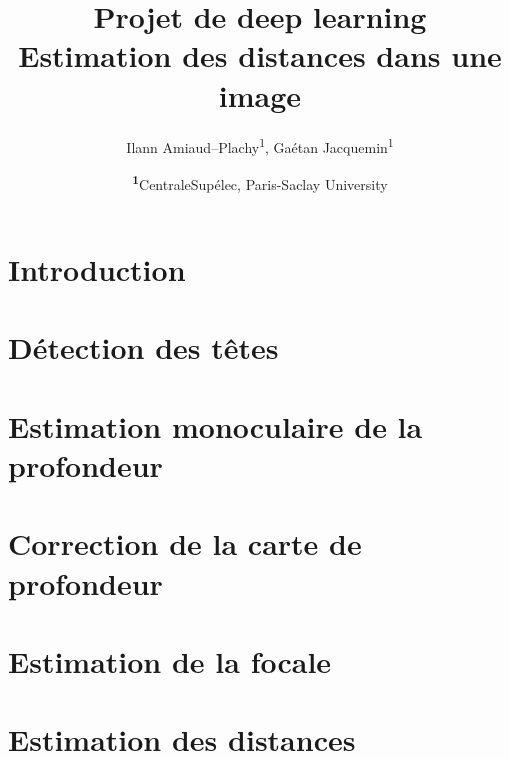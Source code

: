 \documentclass[
	a4paper, %
	10pt, %
	unnumberedsections, %
	twoside, %
]{LTJournalArticle}
\title{Projet de deep learning\\ \LARGE Estimation des distances dans une image} %
\author{%
    Ilann Amiaud--Plachy\textsuperscript{1},
    Gaétan Jacquemin\textsuperscript{1}
}
\date{\footnotesize\textsuperscript{\textbf{1}}CentraleSupélec, Paris-Saclay University}
\begin{document}
    \maketitle %


    \section{Introduction}

        

    \section{Détection des têtes}

        

    \section{Estimation monoculaire de la profondeur}

        

    \section{Correction de la carte de profondeur}

        

    \section{Estimation de la focale}

        

    \section{Estimation des distances}

        

    \printbibliography
\end{document}
